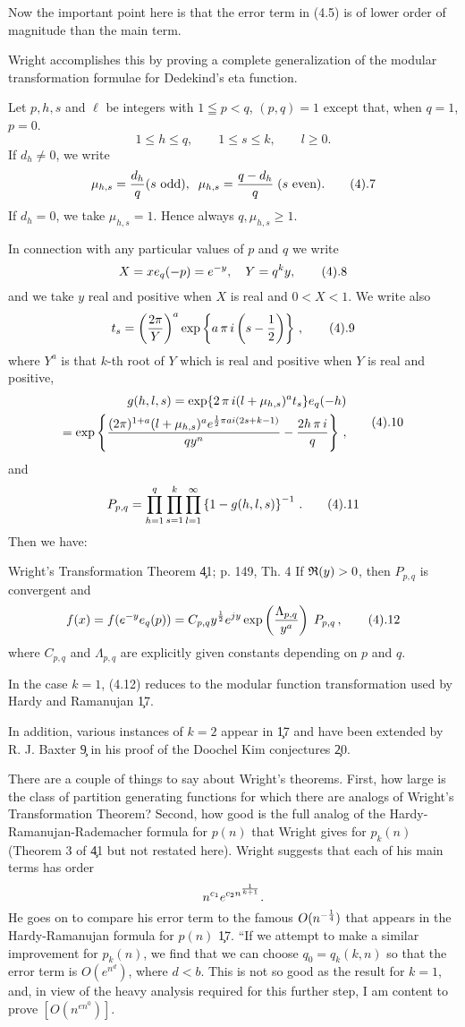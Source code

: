 Now the important point here is that the error term in (4.5) is
of  lower order of magnitude than the
main term.

Wright accomplishes this by proving a complete generalization of 
the modular transformation formulae for Dedekind's eta function.

Let $p,h,s$ and $\ell$ be integers with $1 \leqq p < q$, $(p,q) = 1$
except that, when $q = 1$, $p = 0$.
$$
	1 \leq h \leq q, \qquad 1 \leq s \leq k, \qquad
	l \geq 0.
$$
If $d_h \neq 0$, we write
$$
	\mu_{h,s} = \fr{d_h}{q} (s \text{ odd}),\;\;\mu_{h,s}
	= \fr{q - d_h}{q} \;(s \text{ even}).
\tag4.7
$$
If $d_h = 0$, we take $\mu_{h,s} = 1$.  Hence always $q,\mu_{h,s}
\geq 1$. 

In connection with any particular values of $p$ and $q$ we write
$$
	X = xe_q(-p) = e^{-y}, \quad Y = q^k y,
\tag4.8
$$
and we take $y$ real and positive when $X$ is real and $0 < X < 1$.
We write also
$$
	t_s = \left(\fr{2\pi}{Y}\right)^a \exp \left\{ a \,\pi\,i
	\left( s - \fr12\right)\right\}\,,	
\tag4.9
$$
where $Y^a$ is that $k$-th root of $Y$ which is real and positive
when $Y$ is real and positive,
$$
\split
	g(h,l,s) = \exp \{2\,\pi\,i(l + \mu_{h,s})^a t_s\} e_q
	(-h)   \\	
	= \exp \left\{ \fr{(2\pi)^{1+a}(l + \mu_{h,s})^a e^{\fr12
	\pi a i (2s + k -1)}}{qy^n} - \fr{2h\,\pi\,i}{q} \right\}\,,
\endsplit
\tag4.10
$$
and
$$
	P_{p,q} = \prod_{h=1}^q \prod_{s=1}^k \prod_{l=1}^{\infty}
	\left\{ 1 - g(h,l,s)\right\}^{-1}\,.
\tag4.11
$$
Then we have:

\proclaim
{Wright's Transformation Theorem \c{41; p. 149, Th. 4}}
If $\frak{R}(y) > 0$, then $P_{p,q}$ is convergent and 
$$
	f(x) = f(e^{-y} e_q(p)) = C_{p,q} y^{\fr12} e^{jy} \exp
	\left( \fr{\Lambda_{p,q}}{y^a}\right) \;P_{p,q}\,,
\tag4.12
$$
where $C_{p,q}$ and $\Lambda_{p,q}$ are explicitly given constants
depending on $p$ and $q$.
\endproclaim

In the case $k = 1$, (4.12) reduces to the modular function
transformation used by Hardy and Ramanujan \c{17}.

In addition, various instances of $k = 2$ appear in \c{17} and
have been extended by R. J. Baxter \c9 in his proof of the Doochel Kim
conjectures \c{20}.

There are a couple of things to say about Wright's theorems.  First,
how large is the class of partition generating functions for which
there are analogs of Wright's Transformation Theorem?  Second, how
good is the full analog of the Hardy-Ramanujan-Rademacher formula for
$p(n)$ that Wright gives for $p_k(n)$ (Theorem 3 of \c{41} but not
restated here). Wright suggests that each of his main terms has order
$$
	n^{c_1} e^{c_2 n^{\frac1{k+1}}}.
$$
He goes on to compare his error term to the famous $O(n^{-\frac14})$
that appears in the Hardy-Ramanujan formula for $p(n)$ \c{17}.
``If we attempt to make a similar improvement for $p_k(n)$, we
find that we can choose $q_0 = q_k(k,n)$ so that the error term
is $O(e^{n^d})$, where $d < b$.  This is not so good as the result
for $k = 1$, and, in view of the heavy analysis required for this
further step, I am content to prove $[O(n^{en^0})]$.

